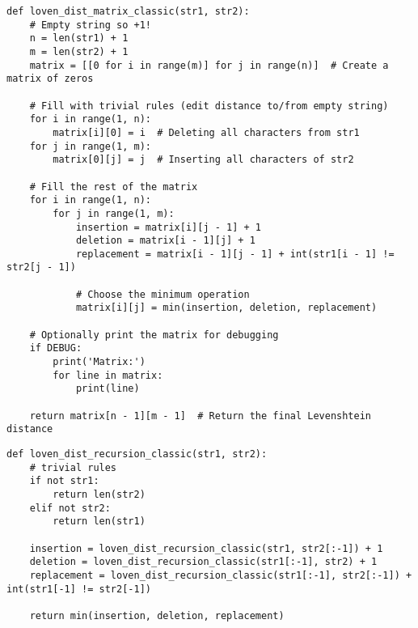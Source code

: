\begin{lstlisting}[caption=Функция поиска расстояния Левенштейна с заполнением матрицы расстояний,
	label={lev_matrix}]
	def loven_dist_matrix_classic(str1, str2):
    # Empty string so +1!
    n = len(str1) + 1
    m = len(str2) + 1
    matrix = [[0 for i in range(m)] for j in range(n)]  # Create a matrix of zeros

    # Fill with trivial rules (edit distance to/from empty string)
    for i in range(1, n):
        matrix[i][0] = i  # Deleting all characters from str1
    for j in range(1, m):
        matrix[0][j] = j  # Inserting all characters of str2

    # Fill the rest of the matrix
    for i in range(1, n):
        for j in range(1, m):
            insertion = matrix[i][j - 1] + 1
            deletion = matrix[i - 1][j] + 1
            replacement = matrix[i - 1][j - 1] + int(str1[i - 1] != str2[j - 1])

            # Choose the minimum operation
            matrix[i][j] = min(insertion, deletion, replacement)

    # Optionally print the matrix for debugging
    if DEBUG:
        print('Matrix:')
        for line in matrix:
            print(line)

    return matrix[n - 1][m - 1]  # Return the final Levenshtein distance

\end{lstlisting}


\begin{lstlisting}[caption=Функция рекурсивного алгоритма поиска расстояния Левенштейна без кеширования,
	label={lev_recursion_classic}]
	def loven_dist_recursion_classic(str1, str2):
    # trivial rules
    if not str1:
        return len(str2)
    elif not str2:
        return len(str1)

    insertion = loven_dist_recursion_classic(str1, str2[:-1]) + 1
    deletion = loven_dist_recursion_classic(str1[:-1], str2) + 1
    replacement = loven_dist_recursion_classic(str1[:-1], str2[:-1]) + int(str1[-1] != str2[-1])

    return min(insertion, deletion, replacement)

\end{lstlisting}

